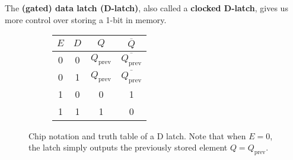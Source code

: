   \begin{definition}
    The \textbf{(gated) data latch (D-latch)}, also called a \textbf{clocked D-latch}, gives us more control over storing a 1-bit in memory. 

    \begin{figure}[H]
      \centering
      \begin{subfigure}[b]{0.48\textwidth}
        \centering
      \end{subfigure}
      \hfill 
      \begin{subfigure}[b]{0.48\textwidth}
        \centering
          \begin{tabular}{|c|c|c|c|}
            \hline
            $E$ & $D$ & $Q$ & $\overline{Q}$ \\
            \hline
            0 & 0 & $Q_{\mathrm{prev}}$ & $\overline{Q_{\mathrm{prev}}}$ \\
            \hline
            0 & 1 & $Q_{\mathrm{prev}}$ & $\overline{Q_{\mathrm{prev}}}$ \\
            \hline
            1 & 0 & 0 & 1 \\
            \hline
            1 & 1 & 1 & 0 \\
            \hline
          \end{tabular}
      \end{subfigure}
      \caption{Chip notation and truth table of a D latch. Note that when $E = 0$, the latch simply outputs the previously stored element $Q = Q_{\mathrm{prev}}$. }
    \end{figure}

    \begin{figure}[H]
      \centering
      \begin{subfigure}[b]{0.48\textwidth}
        \centering
\end{subfigure}
\end{figure}
\end{definition}
